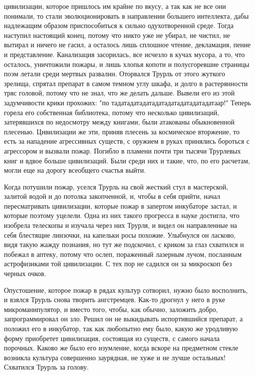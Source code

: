 цивилизации, которое пришлось им крайне по вкусу, а так как
не все они понимали, то стали эволюционировать в направлении
большего интеллекта, дабы надлежащим образом приспособиться
к сильно одухотворенной среде. Тогда наступил настоящий
конец, потому что никто уже не убирал, не чистил, не вытирал
и ничего не гасил, а осталось лишь сплошное чтение,
декламация, пение и представление. Канализация засорилась,
все исчезло в кучах мусора, а то, что осталось, уничтожили
пожары, и лишь хлопья копоти и полусгоревшие страницы поэм
летали среди мертвых развалин. Оторвался Трурль от этого
жуткого зрелища, спрятал препарат в самом темном углу шкафа,
и долго в растерянности тряс головой, потому что не знал,
что же делать дальше. Вывели его из этой задумчивости крики
прохожих: "по тадатадатадатадатадатадатадатадатаар!" Теперь
горела его собственная библиотека, потому что несколько
цивилизаций, затерявшихся по недосмотру между книгами, были
атакованы обыкновенной плесенью. Цивилизации же эти, приняв
плесень за космическое вторжение, то есть за нападение
агрессивных существ, с оружием в руках принялись бороться с
агрессором и вызвали пожар. Погибло в пламени почти три
тысячи Трурлевых книг и вдвое больше цивилизаций. Были среди
них и такие, что, по его расчетам, могли еще на дорогу
всеобщего счастья выйти.

Когда потушили пожар, уселся Трурль на свой жесткий стул
в мастерской, залитой водой и до потолка закопченной, и,
чтобы в себя прийти, начал пересматривать цивилизации,
которые пожар в запертом инкубаторе застал, и которые
поэтому уцелели. Одна из них такого прогресса в науке
достигла, что изобрела телескопы и изучала через них Трурля,
и видел он направленные на себя блестящие линзочки, на
капельки росы похожие. Улыбнулся он ласково, видя такую
жажду познания, но тут же подскочил, с криком за глаз
схватился и побежал в аптеку, потому что ослеп, пораженный
лазерным лучом, посланным астрофизиками той цивилизации. С
тех пор не садился он за микроскоп без черных очков.

Опустошение, которое пожар в рядах культур сотворил,
нужно было восполнить, и взялся Трурль снова творить
ангстремцев. Как-то дрогнул у него в руке микроманипулятор,
и вместо того, чтобы, как обычно, заложить добро,
запрограммировал он зло. Решил он не выкидывать
испортившийся препарат, а положил его в инкубатор, так как
любопытно ему было, какую же уродливую форму приобретет
цивилизация, состоящая из существ, с самого начала порочных.
Каково же было его изумление, когда вскоре на предметном
стекле возникла культура совершенно заурядная, не хуже и не
лучше остальных! Схватился Трурль за голову.

